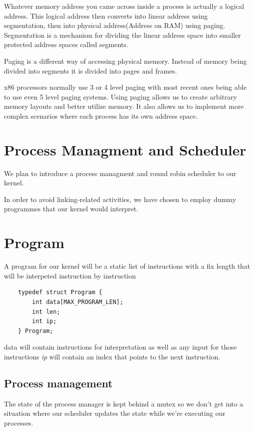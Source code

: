 \documentclass[12pt]{report}
\begin{document}
    Whatever memory address you came across inside a process is actually a logical address. 
    This logical address then converts into linear address using segmentation, then into physical
    address(Address on RAM) using paging. Segmentation is a mechanism for
    dividing the linear address space into smaller protected address spaces called
    segments.

    Paging is a different way of accessing physical memory. Instead of memory 
    being divided into segments it is divided into pages and frames. 
    
    x86 processors normally use 3 or 4 level paging with most recent ones being able
    to use even 5 level paging systems. Using paging allows us to create arbitrary
    memory layouts and better utilize memory. It also allows us to implement
    more complex scenarios where each process has its own address space.

 
	\section{Process Managment and Scheduler}
	We plan to introduce a process managment and round robin scheduler
	to our kernel.
	
	In order to avoid linking-related activities, we have chosen to employ dummy programmes that 
	our kernel would interpret.
	
	\section{Program}
	A program for our kernel will be a static list of instructions with a fix length
	that will be interpeted instruction by instruction
	
	\begin{verbatim}
	typedef struct Program {
    	int data[MAX_PROGRAM_LEN];
    	int len;
    	int ip;
	} Program;
	\end{verbatim}
	
	data will contain instructions for interpretation as well as any input for those instructions
	\textit{ip} will contain an index that points to the next instruction.
	
	\subsection{Process management}
	The state of the process manager is kept behind a mutex so we don't get into a situation
	where our scheduler updates the state while we're executing our processes.
 
\end{document}
